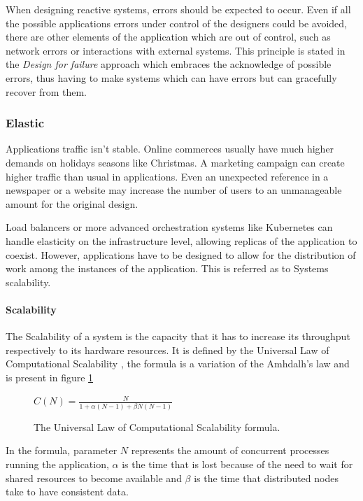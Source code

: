 \documentclass[../main.tex]{subfiles}
\begin{document}
When designing reactive systems, errors should be expected to occur. Even if all
the possible applications errors under control of the designers could be avoided, there
are other elements of the application which are out of control, such as network
errors or interactions with external systems. This principle is stated in the
\textit{Design for failure} approach \autocite{Sussna2015DesigningDelivery} which embraces the
acknowledge of possible errors, thus having to make systems which can have
errors but can gracefully recover from them.

\subsubsection{Elastic}

Applications traffic isn't stable. Online commerces usually have much higher
demands on holidays seasons like Christmas. A marketing campaign can create
higher traffic than usual in applications. Even an unexpected reference in a
newspaper or a website may increase the number of users to an unmanageable
amount for the original design.

Load balancers or more advanced orchestration systems like Kubernetes
\cite{Production-GradeKubernetes} can handle elasticity on the infrastructure
level, allowing replicas of the application to coexist. However, applications
have to be designed to allow for the distribution of work among the instances of the
application. This is referred as to Systems scalability.

\paragraph{Scalability}

The Scalability of a system is the capacity that it has to increase its
throughput respectively to its hardware resources. It is defined by the
Universal Law of Computational Scalability \autocite{Gunther2008AFunctions}, the formula
is a variation of the Amhdalh's law \autocite{Rodgers1985ImprovementsDesign} and is present in figure \ref{fig:scalability}

\begin{figure}[ht] \centering
  $C(N)={\frac {N}{1+\alpha (N-1)+\beta N(N-1)}}$
  \caption{The Universal Law of Computational Scalability formula.}
  \label{fig:scalability}
\end{figure}

In the formula, parameter $N$ represents the amount of concurrent processes
running the application, $\alpha$ is the time that is lost because of the need
to wait for shared resources to become available and $\beta$ is the time that
distributed nodes take to have consistent data.
\end{document}
